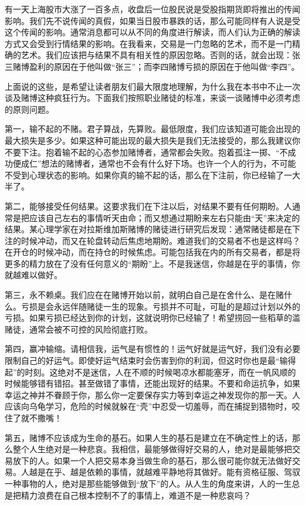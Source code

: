 有一天上海股市大涨了一百多点，收盘后一位股民说是受股指期货即将推出的传闻影响。我们先不说传闻的真假，如果当日股市暴跌的话，那么可能同样有人说是受这个传闻的影响。通常消息都可以从不同的角度进行解读，而人们认为正确的解读方式又会受到行情结果的影响。在我看来，交易是一门忽略的艺术，而不是一门精确的艺术。我们应该把与结果不具有相关性的原因忽略。否则的话，就会出现：张三赌博盈利的原因在于他叫做“张三”；而李四赌博亏损的原因在于他叫做“李四”。

上面说的这些，是希望让读者朋友们最大限度地理解，为什么我在本书中不止一次谈及赌博这种疯狂行为。下面我们按照职业赌徒的标准，来谈一谈赌博中必须考虑的原则问题。

第一，输不起的不赌。君子算战，先算败。最低限度，我们应该知道可能会出现的最大损失是多少。如果这种可能出现的最大损失是我们无法接受的，那么我建议你不要下注。抱着输不起的心态参加赌博者，通常都会失败。抱着孤注一掷、“不成功便成仁”想法的赌博者，通常也不会有什么好下场。也许一个人的行为，不可能不受到心理状态的影响。如果你真的输不起的话，那么在下注前，你已经输了一大半了。

第二，能够接受任何结果。这要求我们在下注以后，对结果不要有任何期盼。人通常是把应该自己左右的事情听天由命；而又想通过期盼来左右只能由“天”来决定的结果。某心理学家在对拉斯维加斯赌博的赌徒进行研究后发现：通常赌徒都是在下注的时候冲动，而又在轮盘转动后焦虑地期盼。难道我们的交易者不也是这样吗？在开仓的时候冲动，而在持仓的时候焦虑。可能包括我在内的所有交易者，都是将更多的精力放在了没有任何意义的“期盼”上。不是我迷信，你越是在乎的事情，你就越难以做好。

第三，永不赖桌。我们应在在赌博开始以前，就明白自己是在舍什么、是在赌什么。亏损是会永远伴随赌徒一生的现象。亏损并不可耻，可耻的是超过计划以外的亏损。如果亏损已经达到你的计划，这就说明你已经输了！希望捞回一些稻草的滥赌徒，通常会被不可控的风险彻底打败。

第四，赢冲输缩。请相信我，运气是有惯性的！运气好就是运气好，我们没有必要限制自己的好运气。即使好运气结束时会伤害到你的利润，但这时你也是最“输得起”的时刻。这绝对不是迷信，人在不顺的时候喝凉水都能塞牙，而在一帆风顺的时候能够错有错招。甚至做错了事情，还能出现好的结果。不要和命运抗争，如果幸运之神并不眷顾于你，那么你一定要保存实力等到幸运之神发现你的那一天。人应该向乌龟学习，危险的时候就躲在“壳”中忍受一切羞辱，而在捕捉到猎物时，咬住了就不撒嘴！

第五，赌博不应该成为生命的基石。如果人生的基石是建立在不确定性上的话，那么整个人生绝对是一种悲哀。我相信，最能够做得好交易的人，绝对是最能够把交易放下的人。如果一个人把交易本身当做生命的基石，那么很可能你就无法做好交易。人越是在乎、越是依赖的事情，就越难平静地将其做好。能有资格征服、驾驭一种事物的人，绝对是那些能够做到“放下”的人。从人生的角度来讲，人的一生总是把精力浪费在自己根本控制不了的事情上，难道不是一种悲哀吗？

